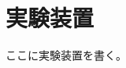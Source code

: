 \documentclass[fleqn]{jreport}
\begin{document}
    \chapter{実験装置}
        ここに実験装置を書く。
\end{document}
